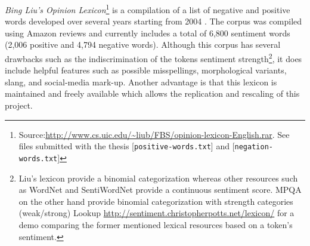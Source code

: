 \documentclass[
	a4paper,
	pdftex,
	12pt,	
	footinclude=true,
	fleqn,
	final,
	]{report}%
\begin{document}
\emph{Bing Liu's Opinion Lexicon}\footnote{Source:\url{http://www.cs.uic.edu/~liub/FBS/opinion-lexicon-English.rar}. See
files submitted with the thesis [\texttt{positive-words.txt}] and [\texttt{negation-words.txt}]}
is a compilation of a list of negative and positive words developed over several years starting from 2004 \cite{Liu2004,Liu2012a}. 
The corpus was compiled using Amazon reviews \cite{Liu2010,Fang2015} and currently includes
a total of 6,800 sentiment words (2,006 positive and 4,794 negative words). Although this corpus has several drawbacks such as the indiscrimination of the tokens sentiment strength\footnote{Liu's lexicon 
provide a binomial categorization whereas other resources such as WordNet and SentiWordNet provide a 
continuous sentiment score. MPQA on the other hand provide binomial categorization with strength categories (weak/strong)
Lookup \url{http://sentiment.christopherpotts.net/lexicon/} for a demo comparing the former mentioned lexical resources based 
on a token's sentiment.}, it does include helpful features such as possible misspellings, morphological variants, slang, and social-media mark-up.
Another advantage is that this lexicon is maintained and freely available\cite{Liu2004} which allows the replication and rescaling of this project.
\end{document}
